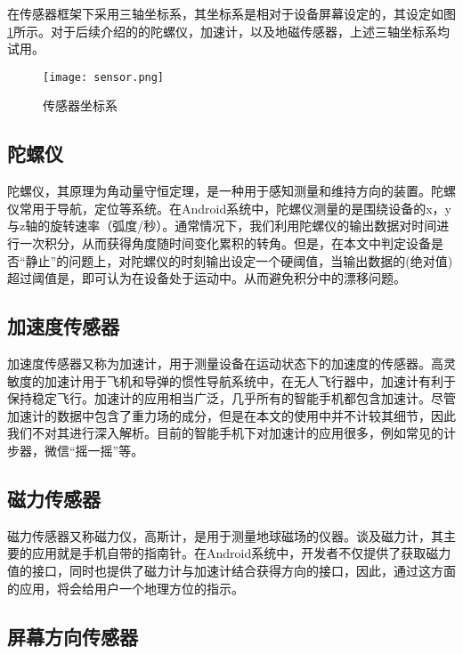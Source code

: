 \documentclass[winfonts,oneside]{njuthesis}
\begin{document}
		在传感器框架下采用三轴坐标系，其坐标系是相对于设备屏幕设定的，其设定如图\ref{fig: sensor}所示。对于后续介绍的的陀螺仪，加速计，以及地磁传感器，上述三轴坐标系均试用。		
		
		\begin{figure}[H]
			\centering
			\texttt{[image: sensor.png]} 
			\caption{传感器坐标系}
			\label{fig: sensor}
		\end{figure}
		
			
		\subsection{陀螺仪}
		
		陀螺仪，其原理为角动量守恒定理，是一种用于感知测量和维持方向的装置。陀螺仪常用于导航，定位等系统。在Android系统中，陀螺仪测量的是围绕设备的x，y与z轴的旋转速率（弧度/秒）。通常情况下，我们利用陀螺仪的输出数据对时间进行一次积分，从而获得角度随时间变化累积的转角。但是，在本文中判定设备是否“静止”的问题上，对陀螺仪的时刻输出设定一个硬阈值，当输出数据的(绝对值)超过阈值是，即可认为在设备处于运动中。从而避免积分中的漂移问题。
			
		\subsection{加速度传感器}
		
		加速度传感器又称为加速计，用于测量设备在运动状态下的加速度的传感器。高灵敏度的加速计用于飞机和导弹的惯性导航系统中\cite{houanlu}，在无人飞行器中，加速计有利于保持稳定飞行。加速计的应用相当广泛，几乎所有的智能手机都包含加速计。尽管加速计的数据中包含了重力场的成分，但是在本文的使用中并不计较其细节，因此我们不对其进行深入解析。目前的智能手机下对加速计的应用很多，例如常见的计步器\cite{jibuqi}，微信“摇一摇”等。
						
		\subsection{磁力传感器}
		
		磁力传感器又称磁力仪，高斯计，是用于测量地球磁场的仪器。谈及磁力计，其主要的应用就是手机自带的指南针。在Android系统中，开发者不仅提供了获取磁力值的接口，同时也提供了磁力计与加速计结合获得方向的接口，因此，通过这方面的应用，将会给用户一个地理方位的指示。
			
		\subsection{屏幕方向传感器}
		
\end{document}
